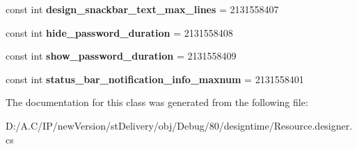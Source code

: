 \begin{DoxyCompactItemize}
const int {\bfseries design\+\_\+snackbar\+\_\+text\+\_\+max\+\_\+lines} = 2131558407
\item 
\mbox{\label{classst_delivery_1_1_resource_1_1_integer_ac9b6dba82c307dc11c753b28eae988ef}} 
const int {\bfseries hide\+\_\+password\+\_\+duration} = 2131558408
\item 
\mbox{\label{classst_delivery_1_1_resource_1_1_integer_a9c8e3be11ece5d24dd73fb50f2ada0b7}} 
const int {\bfseries show\+\_\+password\+\_\+duration} = 2131558409
\item 
\mbox{\label{classst_delivery_1_1_resource_1_1_integer_a13b1cd95c0efac625b6ddb525371e38e}} 
const int {\bfseries status\+\_\+bar\+\_\+notification\+\_\+info\+\_\+maxnum} = 2131558401
\end{DoxyCompactItemize}


The documentation for this class was generated from the following file\+:\begin{DoxyCompactItemize}
\item 
D\+:/\+A.\+C/\+I\+P/new\+Version/st\+Delivery/obj/\+Debug/80/designtime/Resource.\+designer.\+cs\end{DoxyCompactItemize}
